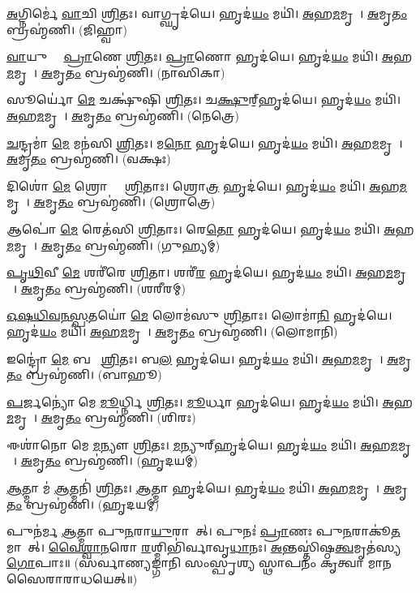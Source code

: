 \ul{𑌅}𑌗𑍍𑌨𑌿𑌰𑍍𑌮𑍇॑ \ul{𑌵𑌾}𑌚𑌿 \ul{𑌶𑍍𑌰𑌿}𑌤𑌃।   𑌵𑌾𑌗𑍍𑌘𑍃𑌦॑𑌯𑍇।   𑌹𑍃𑌦॑\ul{𑌯𑌂} 𑌮𑌯𑌿॑।   \ul{𑌅}𑌹\ul{𑌮}𑌮𑍃𑌤𑍇᳚।   \ul{𑌅}𑌮𑍃\ul{𑌤𑌂} 𑌬𑍍𑌰𑌹𑍍𑌮॑𑌣𑌿। (𑌜𑌿𑌹𑍍𑌵𑌾)

 \ul{𑌵𑌾}𑌯𑍁𑌰𑍍𑌮𑍇᳚ \ul{𑌪𑍍𑌰𑌾}𑌣𑍇 \ul{𑌶𑍍𑌰𑌿}𑌤𑌃।   \ul{𑌪𑍍𑌰𑌾}𑌣𑍋 𑌹𑍃𑌦॑𑌯𑍇।   𑌹𑍃𑌦॑\ul{𑌯𑌂} 𑌮𑌯𑌿॑।   \ul{𑌅}𑌹\ul{𑌮}𑌮𑍃𑌤𑍇᳚।   \ul{𑌅}𑌮𑍃\ul{𑌤𑌂} 𑌬𑍍𑌰𑌹𑍍𑌮॑𑌣𑌿। (𑌨𑌾𑌸𑌿𑌕𑌾)

   𑌸𑍂𑌰𑍍𑌯𑍋॑ \ul{𑌮𑍇} 𑌚𑌕𑍍𑌷𑍁॑𑌷𑌿 \ul{𑌶𑍍𑌰𑌿}𑌤𑌃।   𑌚\ul{𑌕𑍍𑌷𑍁}𑌰𑍍‌॒𑌹𑍃𑌦॑𑌯𑍇।   𑌹𑍃𑌦॑\ul{𑌯𑌂} 𑌮𑌯𑌿॑।   \ul{𑌅}𑌹\ul{𑌮}𑌮𑍃𑌤𑍇᳚।   \ul{𑌅}𑌮𑍃\ul{𑌤𑌂} 𑌬𑍍𑌰𑌹𑍍𑌮॑𑌣𑌿। (𑌨𑍇𑌤𑍍𑌰𑍇)

   \ul{𑌚}𑌨𑍍𑌦𑍍𑌰𑌮𑌾॑ \ul{𑌮𑍇} 𑌮𑌨॑𑌸𑌿 \ul{𑌶𑍍𑌰𑌿}𑌤𑌃।   𑌮\ul{𑌨𑍋} 𑌹𑍃𑌦॑𑌯𑍇।   𑌹𑍃𑌦॑\ul{𑌯𑌂} 𑌮𑌯𑌿॑।   \ul{𑌅}𑌹\ul{𑌮}𑌮𑍃𑌤𑍇᳚।   \ul{𑌅}𑌮𑍃\ul{𑌤𑌂} 𑌬𑍍𑌰𑌹𑍍𑌮॑𑌣𑌿। (𑌵𑌕𑍍𑌷𑌃)

   𑌦𑌿𑌶𑍋॑ \ul{𑌮𑍇} 𑌶𑍍𑌰𑍋𑌤𑍍𑌰𑍇᳚ \ul{𑌶𑍍𑌰𑌿}𑌤𑌾𑌃।   𑌶𑍍𑌰𑍋\ul{𑌤𑍍𑌰}\ul{} 𑌹𑍃𑌦॑𑌯𑍇।   𑌹𑍃𑌦॑\ul{𑌯𑌂} 𑌮𑌯𑌿॑।   \ul{𑌅}𑌹\ul{𑌮}𑌮𑍃𑌤𑍇᳚।   \ul{𑌅}𑌮𑍃\ul{𑌤𑌂} 𑌬𑍍𑌰𑌹𑍍𑌮॑𑌣𑌿। (𑌶𑍍𑌰𑍋𑌤𑍍𑌰𑍇)

   𑌆𑌪𑍋॑ \ul{𑌮𑍇} 𑌰𑍇𑌤॑𑌸𑌿 \ul{𑌶𑍍𑌰𑌿}𑌤𑌾𑌃।   𑌰𑍇\ul{𑌤𑍋} 𑌹𑍃𑌦॑𑌯𑍇।   𑌹𑍃𑌦॑\ul{𑌯𑌂} 𑌮𑌯𑌿॑।   \ul{𑌅}𑌹\ul{𑌮}𑌮𑍃𑌤𑍇᳚।   \ul{𑌅}𑌮𑍃\ul{𑌤𑌂} 𑌬𑍍𑌰𑌹𑍍𑌮॑𑌣𑌿। (𑌗𑍁𑌹𑍍𑌯𑌮𑍍)

   \ul{𑌪𑍃}\ul{𑌥𑌿}𑌵𑍀 \ul{𑌮𑍇} 𑌶𑌰𑍀॑𑌰𑍇 \ul{𑌶𑍍𑌰𑌿}𑌤𑌾।   𑌶𑌰𑍀॑\ul{𑌰}\ul{} 𑌹𑍃𑌦॑𑌯𑍇।   𑌹𑍃𑌦॑\ul{𑌯𑌂} 𑌮𑌯𑌿॑।   \ul{𑌅}𑌹\ul{𑌮}𑌮𑍃𑌤𑍇᳚।   \ul{𑌅}𑌮𑍃\ul{𑌤𑌂} 𑌬𑍍𑌰𑌹𑍍𑌮॑𑌣𑌿। (𑌶𑌰𑍀𑌰𑌮𑍍)

   \ul{𑌓}\ul{𑌷}\ul{𑌧𑌿}\ul{𑌵}\ul{𑌨}\ul{𑌸𑍍𑌪}𑌤𑌯𑍋॑ \ul{𑌮𑍇} 𑌲𑍋𑌮॑𑌸𑍁 \ul{𑌶𑍍𑌰𑌿}𑌤𑌾𑌃।   𑌲𑍋𑌮𑌾॑\ul{𑌨𑌿} 𑌹𑍃𑌦॑𑌯𑍇।   𑌹𑍃𑌦॑\ul{𑌯𑌂} 𑌮𑌯𑌿॑।   \ul{𑌅}𑌹\ul{𑌮}𑌮𑍃𑌤𑍇᳚।   \ul{𑌅}𑌮𑍃\ul{𑌤𑌂} 𑌬𑍍𑌰𑌹𑍍𑌮॑𑌣𑌿। (𑌲𑍋𑌮𑌾𑌨𑌿)

   𑌇𑌨𑍍𑌦𑍍𑌰𑍋॑ \ul{𑌮𑍇} 𑌬𑌲𑍇᳚ \ul{𑌶𑍍𑌰𑌿}𑌤𑌃।   𑌬\ul{𑌲}\ul{} 𑌹𑍃𑌦॑𑌯𑍇।   𑌹𑍃𑌦॑\ul{𑌯𑌂} 𑌮𑌯𑌿॑।   \ul{𑌅}𑌹\ul{𑌮}𑌮𑍃𑌤𑍇᳚।   \ul{𑌅}𑌮𑍃\ul{𑌤𑌂} 𑌬𑍍𑌰𑌹𑍍𑌮॑𑌣𑌿। (𑌬𑌾𑌹𑍂)

   \ul{𑌪}𑌰𑍍𑌜𑌨𑍍𑌯𑍋॑ 𑌮𑍇 \ul{𑌮𑍂}𑌰𑍍𑌧𑍍𑌨𑌿 \ul{𑌶𑍍𑌰𑌿}𑌤𑌃।   \ul{𑌮𑍂}𑌰𑍍𑌧𑌾 𑌹𑍃𑌦॑𑌯𑍇।   𑌹𑍃𑌦॑\ul{𑌯𑌂} 𑌮𑌯𑌿॑।   \ul{𑌅}𑌹\ul{𑌮}𑌮𑍃𑌤𑍇᳚।   \ul{𑌅}𑌮𑍃\ul{𑌤𑌂} 𑌬𑍍𑌰𑌹𑍍𑌮॑𑌣𑌿। (𑌶𑌿𑌰𑌃)

   𑌈𑌶𑌾॑𑌨𑍋 𑌮𑍇 \ul{𑌮}𑌨𑍍𑌯𑍗 \ul{𑌶𑍍𑌰𑌿}𑌤𑌃।   \ul{𑌮}𑌨𑍍𑌯𑍁𑌰𑍍‌𑌹𑍃𑌦॑𑌯𑍇।   𑌹𑍃𑌦॑\ul{𑌯𑌂} 𑌮𑌯𑌿॑।    \ul{𑌅}𑌹\ul{𑌮}𑌮𑍃𑌤𑍇᳚।   \ul{𑌅}𑌮𑍃\ul{𑌤𑌂} 𑌬𑍍𑌰𑌹𑍍𑌮॑𑌣𑌿। (𑌹𑍃𑌦𑌯𑌮𑍍)

   \ul{𑌆}𑌤𑍍𑌮𑌾 𑌮॑ \ul{𑌆}𑌤𑍍𑌮𑌨𑌿॑ \ul{𑌶𑍍𑌰𑌿}𑌤𑌃।   \ul{𑌆}𑌤𑍍𑌮𑌾 𑌹𑍃𑌦॑𑌯𑍇।   𑌹𑍃𑌦॑\ul{𑌯𑌂} 𑌮𑌯𑌿॑।   \ul{𑌅}𑌹\ul{𑌮}𑌮𑍃𑌤𑍇᳚।   \ul{𑌅}𑌮𑍃\ul{𑌤𑌂} 𑌬𑍍𑌰𑌹𑍍𑌮॑𑌣𑌿।
(𑌹𑍃𑌦𑌯𑌮𑍍)

   𑌪𑍁𑌨॑𑌰𑍍𑌮 \ul{𑌆}𑌤𑍍𑌮𑌾 𑌪𑍁\ul{𑌨}𑌰𑌾\ul{𑌯𑍁}𑌰𑌾𑌗𑌾᳚𑌤𑍍।   𑌪𑍁𑌨𑌃॑ \ul{𑌪𑍍𑌰𑌾}𑌣𑌃 𑌪𑍁\ul{𑌨}𑌰𑌾𑌕𑍂॑\ul{𑌤}𑌮𑌾𑌗𑌾᳚𑌤𑍍।   \ul{𑌵𑍈}\ul{𑌶𑍍𑌵𑌾}\ul{𑌨}𑌰𑍋 \ul{𑌰}𑌶𑍍𑌮𑌿𑌭𑌿॑𑌰𑍍𑌵𑌾𑌵𑍃\ul{𑌧𑌾}𑌨𑌃।   \ul{𑌅}𑌨𑍍𑌤𑌸𑍍𑌤𑌿॑𑌷𑍍𑌠\ul{𑌤𑍍𑌵}𑌮𑍃𑌤॑𑌸𑍍𑌯 \ul{𑌗𑍋}𑌪𑌾𑌃॥ (𑌸𑌰𑍍𑌵𑌾𑌣𑍍𑌯𑌙𑍍𑌗𑌾𑌨𑌿 𑌸𑌂𑌸𑍍𑌪𑍃𑌶𑍍𑌯 𑌸𑍍𑌥𑌾𑌪𑌨𑌂 𑌕𑍃𑌤𑍍𑌵𑌾 𑌮𑌾𑌨𑌸𑍈𑌰𑌾𑌰𑌾𑌧𑌯𑍇𑌤𑍍॥)
{\small \closesection}


